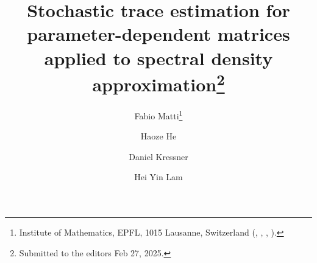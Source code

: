 

\usepackage{lipsum}
\usepackage{amsfonts}
\usepackage{graphicx}
\usepackage{epstopdf}
\usepackage{algorithmic}
\ifpdf
\else
\fi

\newcommand{\creflastconjunction}{, and~}



\title{Stochastic trace estimation for parameter-dependent matrices applied to spectral density approximation\thanks{Submitted to the editors Feb 27, 2025.}}

\author{Fabio Matti\thanks{Institute of Mathematics, EPFL, 1015 Lausanne, Switzerland
  (, , , ).}
\and Haoze He\footnotemark[2]
\and Daniel Kressner\footnotemark[2]
\and Hei Yin Lam\footnotemark[2]}

\usepackage{amsopn}
\DeclareMathOperator{\diag}{diag}



